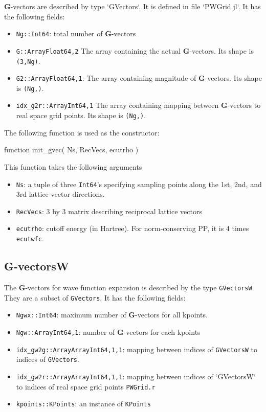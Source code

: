 \documentclass[a4paper,10pt,twocolumn]{paper}
\newcommand{\jlcode}[1]{\texttt{#1}}
\begin{document}
$\mathbf{G}$-vectors are described by type `GVectors`. It is defined in file `PWGrid.jl`.
It has the following fields:
\begin{itemize}
%
\item \jlcode{Ng::Int64}: total number of $\mathbf{G}$-vectors
%
\item \jlcode{G::Array{Float64,2}} The array containing the actual $\mathbf{G}$-vectors.
   Its shape is \jlcode{(3,Ng)}.
%
\item \jlcode{G2::Array{Float64,1}}: The array containing magnitude of $\mathbf{G}$-vectors.
  Its shape is \jlcode{(Ng,)}.
%
\item \jlcode{idx_g2r::Array{Int64,1}} The array containing mapping between $\mathbf{G}$-vectors
  to real space grid points. Its shape is \jlcode{(Ng,)}.
%
\end{itemize}

The following function is used as the constructor:

\begin{juliacode}
function init_gvec( Ns, RecVecs, ecutrho )
\end{juliacode}
%
This function takes the following arguments
%
\begin{itemize}
%
\item \jlcode{Ns}: a tuple of three \jlcode{Int64}'s specifying sampling points
  along the 1st, 2nd, and 3rd lattice vector directions.
%
\item \jlcode{RecVecs}: 3 by 3 matrix describing reciprocal lattice vectors
%
\item \jlcode{ecutrho}: cutoff energy (in Hartree). For norm-conserving PP,
  it is 4 times \jlcode{ecutwfc}.
\end{itemize}


\subsection{G-vectorsW}

The $\mathbf{G}$-vectors for wave function expansion is described by
the type \jlcode{GVectorsW}.
They are a subset of \jlcode{GVectors}. It has the following fields:
\begin{itemize}
%
\item \jlcode{Ngwx::Int64}: maximum number of $\mathbf{G}$-vectors for all kpoints.
%
\item \jlcode{Ngw::Array{Int64,1}}: number of $\mathbf{G}$-vectors for each kpoints
%
\item \jlcode{idx_gw2g::Array{Array{Int64,1},1}}: mapping between indices of
  \jlcode{GVectorsW} to indices of \jlcode{GVectors}.
%
\item \jlcode{idx_gw2r::Array{Array{Int64,1},1}}: mapping between indices of `GVectorsW`
  to indices of real space grid points \jlcode{PWGrid.r}
%
\item \jlcode{kpoints::KPoints}: an instance of \jlcode{KPoints}
%
\end{itemize}
\end{document}
